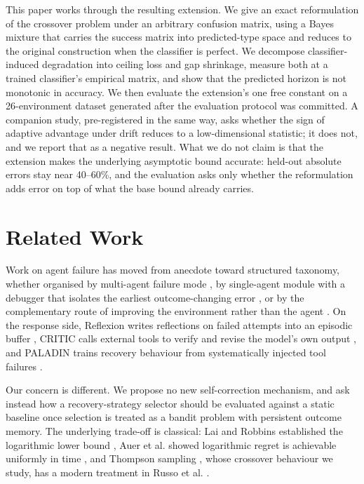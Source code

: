 \documentclass[conference]{IEEEtran}
\begin{document}
This paper works through the resulting extension. We give an exact
reformulation of the crossover problem under an arbitrary confusion matrix,
using a Bayes mixture that carries the success matrix into predicted-type space
and reduces to the original construction when the classifier is perfect. We
decompose classifier-induced degradation into ceiling loss and gap shrinkage,
measure both at a trained classifier's empirical matrix, and show that the
predicted horizon is not monotonic in accuracy. We then evaluate the
extension's one free constant on a 26-environment dataset generated after the
evaluation protocol was committed. A companion study, pre-registered in the
same way, asks whether the sign of adaptive advantage under drift reduces to a
low-dimensional statistic; it does not, and we report that as a negative
result. What we do not claim is that the extension makes the underlying
asymptotic bound accurate: held-out absolute errors stay near 40--60\%, and the
evaluation asks only whether the reformulation adds error on top of what the
base bound already carries.

\section{Related Work}

Work on agent failure has moved from anecdote toward structured taxonomy,
whether organised by multi-agent failure mode \cite{cemri}, by single-agent
module with a debugger that isolates the earliest outcome-changing error
\cite{zhu}, or by the complementary route of improving the environment rather
than the agent \cite{song}. On the response side, Reflexion writes reflections
on failed attempts into an episodic buffer \cite{reflexion}, CRITIC calls
external tools to verify and revise the model's own output \cite{critic}, and
PALADIN trains recovery behaviour from systematically injected tool failures
\cite{paladin}.

Our concern is different. We propose no new self-correction mechanism, and ask
instead how a recovery-strategy selector should be evaluated against a static
baseline once selection is treated as a bandit problem with persistent outcome
memory. The underlying trade-off is classical: Lai and Robbins established the
logarithmic lower bound \cite{lai}, Auer et al. showed logarithmic regret is
achievable uniformly in time \cite{auer}, and Thompson sampling
\cite{thompson}, whose crossover behaviour we study, has a modern treatment in
Russo et al. \cite{russo}.
\end{document}
